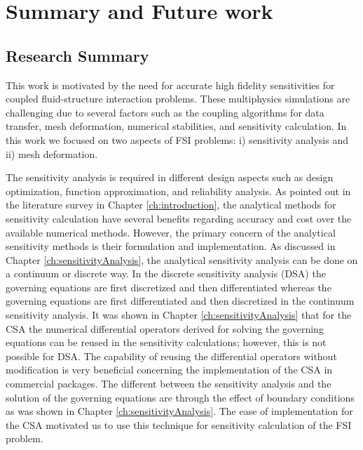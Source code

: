 \chapter{Summary and Future work}
\section{Research Summary}
This work is motivated by the need for accurate high fidelity sensitivities for coupled fluid-structure interaction problems. These multiphysics simulations are challenging due to several factors such as the coupling algorithms for data transfer, mesh deformation, numerical stabilities, and sensitivity calculation. In this work we focused on two aspects of FSI problems: i) sensitivity analysis and ii) mesh deformation.

The sensitivity analysis is required in different design aspects such as design optimization, function approximation, and reliability analysis. As pointed out in the literature survey in Chapter \ref{ch:introduction}, the analytical methods for sensitivity calculation have several benefits regarding accuracy and cost over the available numerical methods. However, the primary concern of the analytical sensitivity methods is their formulation and implementation. As discussed in Chapter \ref{ch:sensitivityAnalysis}, the analytical sensitivity analysis can be done on a continuum or discrete way. In the discrete sensitivity analysis (DSA) the governing equations are first discretized and then differentiated whereas the governing equations are first differentiated and then discretized in the continuum sensitivity analysis. It was shown in Chapter \ref{ch:sensitivityAnalysis} that for the CSA the numerical differential operators derived for solving the governing equations can be reused in the sensitivity calculations; however, this is not possible for DSA. The capability of reusing the differential operators without modification is very beneficial concerning the implementation of the CSA in commercial packages. The different between the sensitivity analysis and the solution of the governing equations are through the effect of boundary conditions as was shown in Chapter \ref{ch:sensitivityAnalysis}. The ease of implementation for the CSA motivated us to use this technique for sensitivity calculation of the FSI problem.


